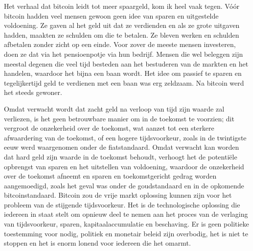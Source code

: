Het verhaal dat bitcoin leidt tot meer spaargeld, kom ik heel vaak tegen. Vóór bitcoin hadden veel mensen gewoon geen idee van sparen en uitgestelde voldoening. Ze gaven al het geld uit dat ze verdienden en als ze grote uitgaven hadden, maakten ze schulden om die te betalen. Ze bleven werken en schulden afbetalen zonder zicht op een einde. Voor zover de meeste mensen investeren, doen ze dat via het pensioenpotje via hun bedrijf. Mensen die wel beleggen zijn meestal degenen die veel tijd besteden aan het bestuderen van de markten en het handelen, waardoor het bijna een baan wordt. Het idee om passief te sparen en tegelijkertijd geld te verdienen met een baan was erg zeldzaam. Na bitcoin werd het steeds gewoner.

Omdat verwacht wordt dat zacht geld na verloop van tijd zijn waarde zal verliezen, is het geen betrouwbare manier om in de toekomst te voorzien; dit vergroot de onzekerheid over de toekomst, wat aanzet tot een sterkere afwaardering van de toekomst, of een hogere tijdsvoorkeur, zoals in de twintigste eeuw werd waargenomen onder de fiatstandaard. Omdat verwacht kan worden dat hard geld zijn waarde in de toekomst behoudt, verhoogt het de potentiële opbrengst van sparen en het uitstellen van voldoening, waardoor de onzekerheid over de toekomst afneemt en sparen en toekomstgericht gedrag worden aangemoedigd, zoals het geval was onder de goudstandaard en in de opkomende bitcoinstandaard. Bitcoin zou de vrije markt oplossing kunnen zijn voor het probleem van de stijgende tijdsvoorkeur. Het is de technologische oplossing die iedereen in staat stelt om opnieuw deel te nemen aan het proces van de verlaging van tijdsvoorkeur, sparen, kapitaalaccumulatie en beschaving. Er is geen politieke toestemming voor nodig, politiek en monetair beleid zijn overbodig, het is niet te stoppen en het is enorm lonend voor iedereen die het omarmt.
